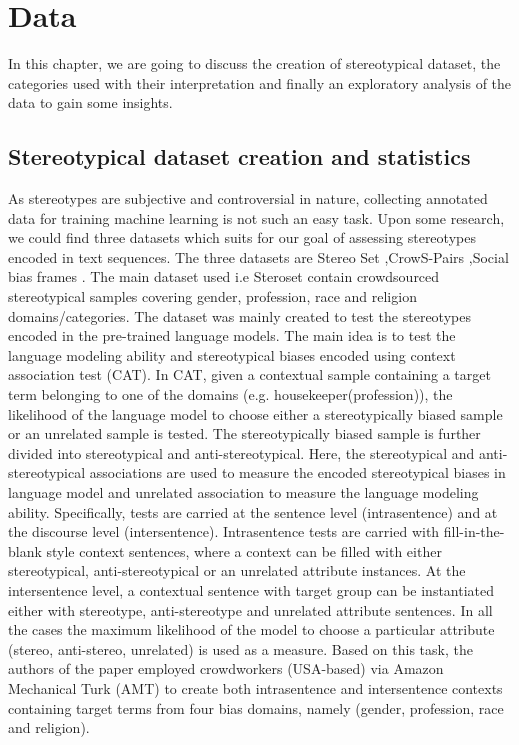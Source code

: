 \chapter{Data}

In this chapter, we are going to discuss the creation of stereotypical dataset, the categories used with their interpretation and finally an exploratory analysis of the data to gain some insights.

\section{Stereotypical dataset creation and statistics}
As stereotypes are subjective and controversial in nature, collecting annotated data for training machine learning is not such an easy task. Upon some research, we could find three datasets which suits for our goal of assessing stereotypes encoded in text sequences. The three datasets are Stereo Set \cite{nadeem2020stereoset},CrowS-Pairs \cite{nangia2020crows},Social bias frames \cite{sap2019social}. The main dataset used i.e Steroset \cite{nadeem2020stereoset} contain crowdsourced stereotypical samples covering gender, profession, race and religion domains/categories. The dataset was mainly created to test the stereotypes encoded in the pre-trained language models. The main idea is to test the language modeling ability and stereotypical biases encoded using context association test (CAT). In CAT, given a contextual sample containing a target term belonging to one of the domains (e.g. housekeeper(profession)), the likelihood of the language model to choose either a stereotypically biased sample or an unrelated sample is tested. The stereotypically biased sample is further divided into stereotypical and anti-stereotypical. Here, the stereotypical and anti-stereotypical associations  are used to measure the encoded stereotypical biases in language model and unrelated association to measure the language modeling ability. Specifically, tests are carried at the sentence level (intrasentence) and at the discourse level (intersentence). Intrasentence tests are carried with fill-in-the-blank style context sentences, where a context can be filled with either stereotypical, anti-stereotypical or an unrelated attribute instances. At the intersentence level, a contextual sentence with target group can be instantiated either with stereotype, anti-stereotype and unrelated attribute sentences. In all the cases the maximum likelihood of the model to choose a particular attribute (stereo, anti-stereo, unrelated) is used as a measure. Based on this task, the authors of the paper employed crowdworkers (USA-based) via Amazon Mechanical Turk (AMT) to create both intrasentence and intersentence contexts containing target terms from four bias domains, namely (gender, profession, race and religion). 
